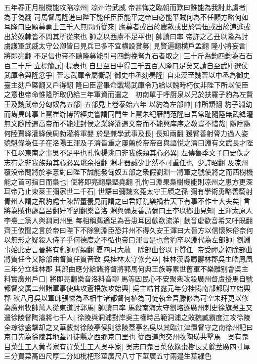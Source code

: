 五年春正月樹機能攻陷凉州|{
	凉州治武威}
帝甚悔之臨朝而歎曰誰能為我討此虜者|{
	為于偽翻}
司馬督馬隆進曰陛下能任臣臣能平之帝曰必能平賊何為不任顧方略何如耳隆曰臣願募勇士三千人無問所從來|{
	應募者或出於農畝或出於營伍或出於逋逃或出於奴隸皆不問其所從來也}
帥之以西虜不足平也|{
	帥讀曰率}
帝許之乙丑以隆為討虜護軍武威太守公卿皆曰見兵已多不宜横設賞募|{
	見賢遍翻横戶孟翻}
隆小將妄言|{
	將即亮翻}
不足信也帝不聽隆募能引弓四鈞挽弩九石者取之|{
	三十斤為鈞四鈞為石石百二十斤}
立標簡試|{
	標表也}
自旦至日中得三千五百人隆曰足矣又請自至武庫選仗武庫令與隆忿爭|{
	晉志武庫令屬衛尉}
御史中丞劾奏隆|{
	自東漢至魏晉以中丞為御史臺主劾戶槩翻又戶得翻}
隆曰臣當畢命戰場武庫令乃給以魏時朽仗非陛下所以使臣之意也帝命惟隆所取仍給三年軍資而遣之　初南單于呼厨泉以兄於扶羅子豹為左賢王及魏武帝分匈奴為五部|{
	五部見上卷泰始六年}
以豹為左部帥|{
	帥所類翻}
豹子淵幼而雋異師事上黨崔游博習經史嘗謂同門生上黨朱紀雁門范隆曰吾常耻隨陸無武絳灌無文隨陸遇高帝而不能建封侯之業絳灌遇文帝而不能興庠序之敎豈不惜哉|{
	隨陸隨何陸賈絳灌絳侯周勃灌將軍嬰}
於是兼學武事及長|{
	長知兩翻}
猨臂善射膂力過人姿貌魁偉為任子在洛陽王渾及子濟皆重之屢薦於帝帝召與語悦之濟曰淵有文武長才陛下任以東南之事吳不足平也孔恂楊珧曰非我族類其心必異|{
	左傳魯季文子曰史佚之志冇之非我族類其心必異珧余招翻}
淵才器誠少比然不可重任也|{
	少詩昭翻}
及凉州覆没帝問將於李憙對曰陛下誠能發匈奴五部之衆假劉淵一將軍之號使將之而西樹機能之首可指日而梟也|{
	使將即亮翻梟堅堯翻}
孔恂曰淵果梟樹機能則凉州之患方更深耳帝乃止東萊王彌家世二千石|{
	世語曰彌魏玄菟太守王頎之孫}
彌有學術勇略善騎射青州人謂之飛豹處士陳留董養見而謂之曰君好亂樂禍若天下有事不作士大夫矣|{
	言將為賊也處昌呂翻好呼到翻樂音洛}
淵與彌友善謂彌曰王李以鄉曲見知|{
	王渾太原人李憙上黨人與澗同州里}
每相稱薦適足為吾患耳因歔欷流涕|{
	歔音虚欷音希又吁既翻}
齊王攸聞之言於帝曰陛下不除劉淵臣恐并州不得久安王渾曰大晉方以信懷殊俗奈何以無形之疑殺人侍子乎何德度之不弘也帝曰渾言是也會豹卒以淵代為左部帥|{
	劉淵事始此史言晉將有亂帥所類翻}
夏四月大赦　除部曲督以下質任|{
	帝受禪之初除部曲將質任今又除部曲督質任質音致}
吳桂林太守修允卒|{
	桂林漢縣屬欝林郡吳主皓鳳凰三年分立桂林郡}
其部曲應分給諸將督將郭馬何典王族等累世舊軍不樂離别會吳主料實廣州戶口|{
	將即亮翻樂音洛料音聊}
馬等因民心不安聚衆攻殺廣州督虞授馬自號都督交廣二州諸軍事使典攻蒼梧族攻始興|{
	吳主皓甘露元年分桂陽南部都尉立始興郡}
秋八月吳以軍師張悌為丞相牛渚都督何植為司徒執金吾滕修為司空未拜更以修為廣州牧帥萬人從東道討郭馬|{
	帥讀曰率}
馬殺南海太守劉略逐廣州刺史徐旗吳主又遣徐陵督陶濬將七千人|{
	徐陵與洞浦對岸吳主權時呂範洞浦之敗魏臧霸度江攻徐陵全琮徐盛擊却之又華覈封徐陵亭侯則徐陵蓋亭名吳以其臨江津置督守之南徐州記曰京口先為徐陵其地蓋丹徒縣之西鄉京口里也}
從西道與交州牧陶璜共擊馬　吳有鬼目菜生工人黄耉家有買菜生工人吳平家|{
	吳志曰鬼日菜依緣棗樹長丈餘莖廣四寸厚三分買菜高四尺厚二分如枇杷形莖廣尺八寸下莖廣五寸兩邉生葉緑色}
